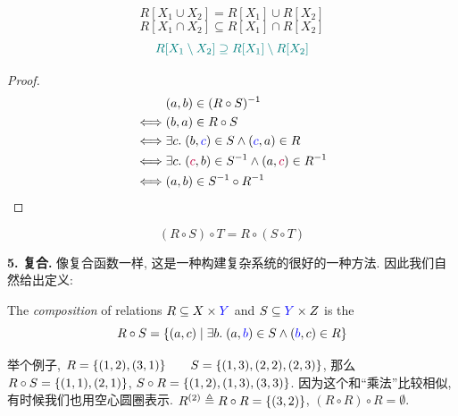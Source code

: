 \begin{theorem}
  \[
    R[X_1 \cup X_2] = R[X_1] \cup R[X_2]
  \]
  \[
    R[X_1 \cap X_2] \subseteq R[X_1] \cap R[X_2]
  \]
  \[
    \textcolor{teal}{R[X_1 \setminus X_2] \supseteq R[X_1] \setminus R[X_2]}
  \]
\end{theorem}
\begin{proof}
  \setcounter{equation}{0}
  \begin{align*}
    &(a, b) \in (R \circ S)^{-1} \\
    \iff& (b, a) \in R \circ S \\
    \iff& \exists c.\; (b, \textcolor{blue}{c}) \in S \land (\textcolor{blue}{c}, a) \in R \\
    \iff& \exists c.\; (\textcolor{purple}{c}, b) \in S^{-1} \land (a, \textcolor{purple}{c}) \in R^{-1} \\
    \iff& (a, b) \in S^{-1} \circ R^{-1}
  \end{align*}
\end{proof}
\begin{theorem}
  \[
    (R \circ S) \circ T = R \circ (S \circ T)
  \]
\end{theorem}

\textbf{5. 复合. } 像复合函数一样, 这是一种构建复杂系统的很好的一种方法. 因此我们自然给出定义: 
\begin{definition}
  The {\it composition} of relations $R \subseteq X \times \textcolor{blue}{Y}$
  and $S \subseteq \textcolor{blue}{Y} \times Z$ is the 
  \[
    R \circ S = \{(a, c) \mid \exists b.\; (a, \textcolor{blue}{b}) \in S \land (\textcolor{blue}{b}, c) \in R\}
  \]
\end{definition}

举个例子, $R = \{(1, 2), (3, 1)\} \qquad S = \{(1, 3), (2, 2), (2, 3)\}$, 那么$R \circ S = \{(1, 1), (2, 1)\}$, $S \circ R = \{(1, 2), (1, 3), (3, 3)\}$. 因为这个和``乘法''比较相似, 有时候我们也用空心圆圈表示. $R^{(2)} \triangleq R \circ R = \{(3, 2)\}$, $ (R \circ R) \circ R =  \emptyset$. 

